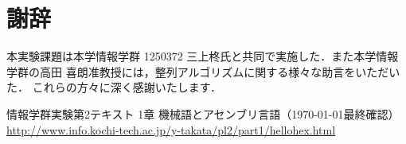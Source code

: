\section*{謝辞}
本実験課題は本学情報学群 1250372 三上柊氏と共同で実施した．また本学情報学群の高田 喜朗准教授には，整列アルゴリズムに関する様々な助言をいただいた．
これらの方々に深く感謝いたします．
\begin{thebibliography}{99}
     情報学群実験第2テキスト 1章 機械語とアセンブリ言語（\today 最終確認）\\
    \url{http://www.info.kochi-tech.ac.jp/y-takata/pl2/part1/hellohex.html}
\end{thebibliography}